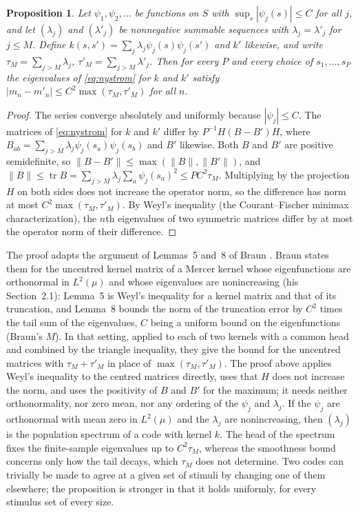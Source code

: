 \documentclass[11pt]{article}
\newtheorem{proposition}{Proposition}
\theoremstyle{definition}
\begin{document}
\begin{proposition}\label{prop:window}
Let $\psi_1, \psi_2, \dots$ be functions on $S$ with $\sup_s |\psi_j(s)| \le C$ for all $j$, and let $(\lambda_j)$ and $(\lambda'_j)$ be nonnegative summable sequences with $\lambda_j = \lambda'_j$ for $j \le M$. Define $k(s, s') = \sum_j \lambda_j \psi_j(s)\psi_j(s')$ and $k'$ likewise, and write $\tau_M = \sum_{j > M} \lambda_j$, $\tau'_M = \sum_{j > M} \lambda'_j$. Then for every $P$ and every choice of $s_1, \dots, s_P$ the eigenvalues of \eqref{eq:nystrom} for $k$ and $k'$ satisfy $|m_n - m'_n| \le C^2 \max(\tau_M, \tau'_M)$ for all $n$.
\end{proposition}

\begin{proof}
The series converge absolutely and uniformly because $|\psi_j| \le C$. The matrices of \eqref{eq:nystrom} for $k$ and $k'$ differ by $P^{-1} H (B - B') H$, where $B_{ab} = \sum_{j > M} \lambda_j \psi_j(s_a)\psi_j(s_b)$ and $B'$ likewise. Both $B$ and $B'$ are positive semidefinite, so $\|B - B'\| \le \max(\|B\|, \|B'\|)$, and $\|B\| \le \operatorname{tr} B = \sum_{j>M}\lambda_j \sum_a \psi_j(s_a)^2 \le P C^2 \tau_M$. Multiplying by the projection $H$ on both sides does not increase the operator norm, so the difference has norm at most $C^2 \max(\tau_M, \tau'_M)$. By Weyl's inequality (the Courant--Fischer minimax characterization), the $n$th eigenvalues of two symmetric matrices differ by at most the operator norm of their difference.
\end{proof}

The proof adapts the argument of Lemmas~5 and~8 of Braun \cite{braun2006}. Braun states them for the uncentred kernel matrix of a Mercer kernel whose eigenfunctions are orthonormal in $L^2(\mu)$ and whose eigenvalues are nonincreasing (his Section~2.1): Lemma~5 is Weyl's inequality for a kernel matrix and that of its truncation, and Lemma~8 bounds the norm of the truncation error by $C^2$ times the tail sum of the eigenvalues, $C$ being a uniform bound on the eigenfunctions (Braun's $M$). In that setting, applied to each of two kernels with a common head and combined by the triangle inequality, they give the bound for the uncentred matrices with $\tau_M + \tau'_M$ in place of $\max(\tau_M, \tau'_M)$. The proof above applies Weyl's inequality to the centred matrices directly, uses that $H$ does not increase the norm, and uses the positivity of $B$ and $B'$ for the maximum; it needs neither orthonormality, nor zero mean, nor any ordering of the $\psi_j$ and $\lambda_j$. If the $\psi_j$ are orthonormal with mean zero in $L^2(\mu)$ and the $\lambda_j$ are nonincreasing, then $(\lambda_j)$ is the population spectrum of a code with kernel $k$. The head of the spectrum fixes the finite-sample eigenvalues up to $C^2 \tau_M$, whereas the smoothness bound concerns only how the tail decays, which $\tau_M$ does not determine. Two codes can trivially be made to agree at a given set of stimuli by changing one of them elsewhere; the proposition is stronger in that it holds uniformly, for every stimulus set of every size.
\end{document}
